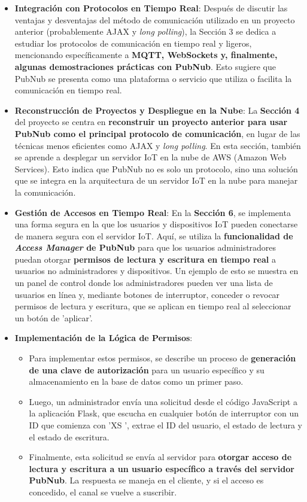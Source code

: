 \documentclass{report}
\begin{document}
\begin{itemize}
    \item \textbf{Integración con Protocolos en Tiempo Real}: Después de discutir las ventajas y desventajas del método de comunicación utilizado en un 
    proyecto anterior (probablemente AJAX y \textit{long polling}), la Sección 3 se dedica a estudiar los protocolos de comunicación en tiempo real y ligeros, 
    mencionando específicamente a \textbf{MQTT, WebSockets y, finalmente, algunas demostraciones prácticas con PubNub}. Esto sugiere que PubNub se presenta 
    como una plataforma o servicio que utiliza o facilita la comunicación en tiempo real.

    \item \textbf{Reconstrucción de Proyectos y Despliegue en la Nube}: La \textbf{Sección 4} del proyecto se centra en \textbf{reconstruir un proyecto 
    anterior para usar PubNub como el principal protocolo de comunicación}, en lugar de las técnicas menos eficientes como AJAX y \textit{long polling}. 
    En esta sección, también se aprende a desplegar un servidor IoT en la nube de AWS (Amazon Web Services). Esto indica que PubNub no es solo un 
    protocolo, sino una solución que se integra en la arquitectura de un servidor IoT en la nube para manejar la comunicación.

    \item \textbf{Gestión de Accesos en Tiempo Real}: En la \textbf{Sección 6}, se implementa una forma segura en la que los usuarios y dispositivos IoT 
    pueden conectarse de manera segura con el servidor IoT. Aquí, se utiliza la \textbf{funcionalidad de \textit{Access Manager} de PubNub} para que los 
    usuarios administradores puedan otorgar \textbf{permisos de lectura y escritura en tiempo real} a usuarios no administradores y dispositivos. 
    Un ejemplo de esto se muestra en un panel de control donde los administradores pueden ver una lista de usuarios en línea y, mediante botones de 
    interruptor, conceder o revocar permisos de lectura y escritura, que se aplican en tiempo real al seleccionar un botón de  'aplicar'.

    \item \textbf{Implementación de la Lógica de Permisos}:
    \begin{itemize}
        \item Para implementar estos permisos, se describe un proceso de \textbf{generación de una clave de autorización} para un usuario específico y 
        su almacenamiento en la base de datos como un primer paso.
        \item Luego, un administrador envía una solicitud desde el código JavaScript a la aplicación Flask, que escucha en cualquier botón de interruptor 
        con un ID que comienza con  'XS ', extrae el ID del usuario, el estado de lectura y el estado de escritura.
        \item Finalmente, esta solicitud se envía al servidor para \textbf{otorgar acceso de lectura y escritura a un usuario específico a través del 
        servidor PubNub}. La respuesta se maneja en el cliente, y si el acceso es concedido, el canal se vuelve a suscribir.
    \end{itemize}
\end{itemize}
\end{document}
